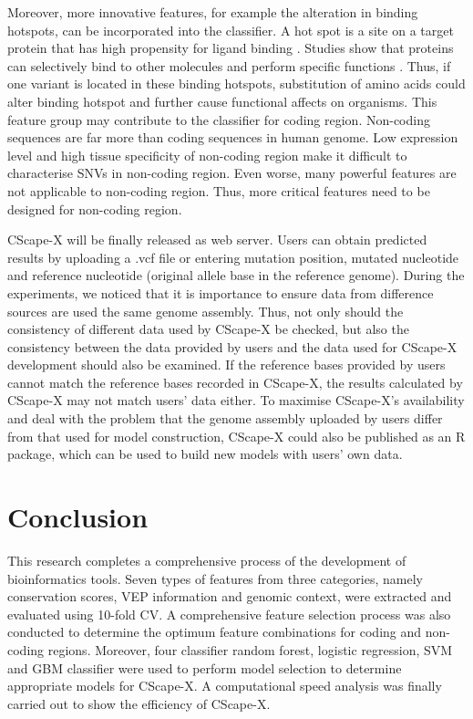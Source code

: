 \documentclass[a4paper,nohyper,nobib,openany,justified]{tufte-book}
\begin{document}
\begin{fullwidth}
Moreover, more innovative features, for example the alteration in binding hotspots, can be incorporated into the classifier. A hot spot is a site on a target protein that has high propensity for ligand binding \cite{Zerbe2012}. Studies show that proteins can selectively bind to other molecules and perform specific functions \cite{Chen2016}. Thus, if one variant is located in these binding hotspots, substitution of amino acids could alter binding hotspot and further cause functional affects on organisms. This feature group may contribute to the classifier for coding region. Non-coding sequences are far more than coding sequences in human genome. Low expression level and high tissue specificity of non-coding region make it difficult to characterise SNVs in non-coding region. Even worse, many powerful features are not applicable to non-coding region. Thus, more critical features need to be designed for non-coding region.

CScape-X will be finally released as web server. Users can obtain predicted results by uploading a .vcf file or entering mutation position, mutated nucleotide and reference nucleotide (original allele base in the reference genome). During the experiments, we noticed that it is importance to ensure data from difference sources are used the same genome assembly. Thus, not only should the consistency of different data used by CScape-X be checked, but also the consistency between the data provided by users and the data used for CScape-X development should also be examined. If the reference bases provided by users cannot match the reference bases recorded in CScape-X, the results calculated by CScape-X may not match users' data either. To maximise CScape-X's availability and deal with the problem that the genome assembly uploaded by users differ from that used for model construction, CScape-X could also be published as an R package, which can be used to build new models with users' own data.

\section{Conclusion}

This research completes a comprehensive process of the development of bioinformatics tools. Seven types of features from three categories, namely conservation scores, VEP information and genomic context, were extracted and evaluated using 10-fold CV. A comprehensive feature selection process was also conducted to determine the optimum feature combinations for coding and non-coding regions. Moreover, four classifier random forest, logistic regression, SVM and GBM classifier were used to perform model selection to determine appropriate models for CScape-X. A computational speed analysis was finally carried out to show the efficiency of CScape-X.


\end{fullwidth}
\end{document}
